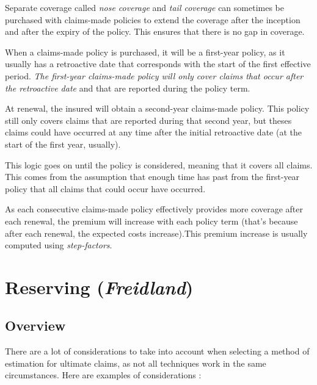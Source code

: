 \documentclass[11pt, english]{memoir}
\numberwithin{definition}{section}
\begin{document}
Separate coverage called \emph{nose coverage} and \emph{tail coverage} can sometimes be purchased with claims-made policies to extend the coverage after the inception and after the expiry of the policy. This ensures that there is no gap in coverage. 

When a claims-made policy is purchased, it will be a first-year policy, as it usually has a retroactive date that corresponds with the start of the first effective period. \emph{The first-year claims-made policy will only cover claims that occur after the retroactive date} and that are reported during the policy term. 

At renewal, the insured will obtain a second-year claims-made policy. This policy still only covers claims that are reported during that second year, but theses claims could have occurred at any time after the initial retroactive date (at the start of the first year, usually). 

This logic goes on until the policy is considered, meaning that it covers all claims. This comes from the assumption that enough time has past from the first-year policy that all claims that could occur have occurred. 


As each consecutive claims-made policy effectively provides more coverage after each renewal, the premium will increase with each policy term (that's because after each renewal, the expected costs increase).This premium increase is usually computed using \emph{step-factors}. 































\part{Reserving (\emph{Freidland})}
	




\chapter{Overview}
There are a lot of considerations to take into account when selecting a method of estimation for ultimate claims, as not all techniques work in the same circumstances. Here are examples of considerations : 
\end{document}
